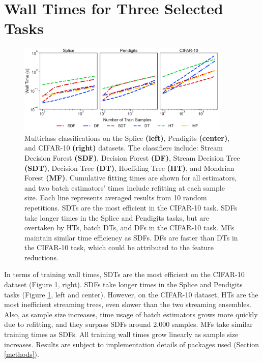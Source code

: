 \section{Wall Times for Three Selected Tasks}
\label{app:select_time}

\begin{figure}[!htb]
\centering
\includegraphics[width=0.9\textwidth]{select_time}
  \caption{Multiclass classifications on the Splice \textbf{(left)}, Pendigits \textbf{(center)}, and CIFAR-10 \textbf{(right)} datasets. The classifiers include: Stream Decision Forest \textbf{(SDF)}, Decision Forest \textbf{(DF)}, Stream Decision Tree \textbf{(SDT)}, Decision Tree \textbf{(DT)}, Hoeffding Tree \textbf{(HT)}, and Mondrian Forest \textbf{(MF)}. 
  Cumulative fitting times are shown for all estimators, and two batch estimators' times include refitting at each sample size. Each line represents averaged results from 10 random repetitions. SDTs are the most efficient in the CIFAR-10 task. SDFs take longer times in the Splice and Pendigits tasks, but are overtaken by HTs, batch DTs, and DFs in the CIFAR-10 task. MFs maintain similar time efficiency as SDFs. DFs are faster than DTs in the CIFAR-10 task, which could be attributed to the feature reductions.
  }
\label{fig:select_time}
\end{figure}

In terms of training wall times, SDTs are the most efficient on the CIFAR-10 dataset (Figure \ref{fig:select_time}, right). 
SDFs take longer times in the Splice and Pendigits tasks (Figure \ref{fig:select_time}, left and center). However, on the CIFAR-10 dataset, HTs are the most inefficient streaming trees, even slower than the two streaming ensembles. Also, as sample size increases, time usage of batch estimators grows more quickly due to refitting, and they surpass SDFs around 2,000 samples. MFs take similar training times as SDFs.
All training wall times grow linearly as sample size increases. Results are subject to implementation details of packages used (Section \ref{methods}).

